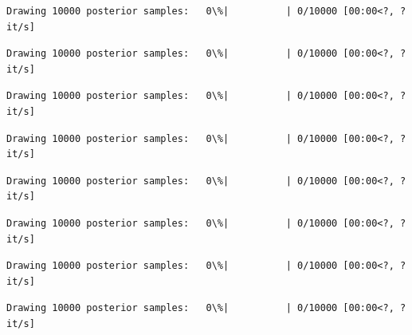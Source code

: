 \documentclass[11pt]{article}
\begin{document}
    
    \begin{Verbatim}[commandchars=\\\{\}]
Drawing 10000 posterior samples:   0\%|          | 0/10000 [00:00<?, ?it/s]
    \end{Verbatim}

    
    
    \begin{Verbatim}[commandchars=\\\{\}]
Drawing 10000 posterior samples:   0\%|          | 0/10000 [00:00<?, ?it/s]
    \end{Verbatim}

    
    
    \begin{Verbatim}[commandchars=\\\{\}]
Drawing 10000 posterior samples:   0\%|          | 0/10000 [00:00<?, ?it/s]
    \end{Verbatim}

    
    
    \begin{Verbatim}[commandchars=\\\{\}]
Drawing 10000 posterior samples:   0\%|          | 0/10000 [00:00<?, ?it/s]
    \end{Verbatim}

    
    
    \begin{Verbatim}[commandchars=\\\{\}]
Drawing 10000 posterior samples:   0\%|          | 0/10000 [00:00<?, ?it/s]
    \end{Verbatim}

    
    
    \begin{Verbatim}[commandchars=\\\{\}]
Drawing 10000 posterior samples:   0\%|          | 0/10000 [00:00<?, ?it/s]
    \end{Verbatim}

    
    
    \begin{Verbatim}[commandchars=\\\{\}]
Drawing 10000 posterior samples:   0\%|          | 0/10000 [00:00<?, ?it/s]
    \end{Verbatim}

    
    
    \begin{Verbatim}[commandchars=\\\{\}]
Drawing 10000 posterior samples:   0\%|          | 0/10000 [00:00<?, ?it/s]
    \end{Verbatim}
\end{document}
